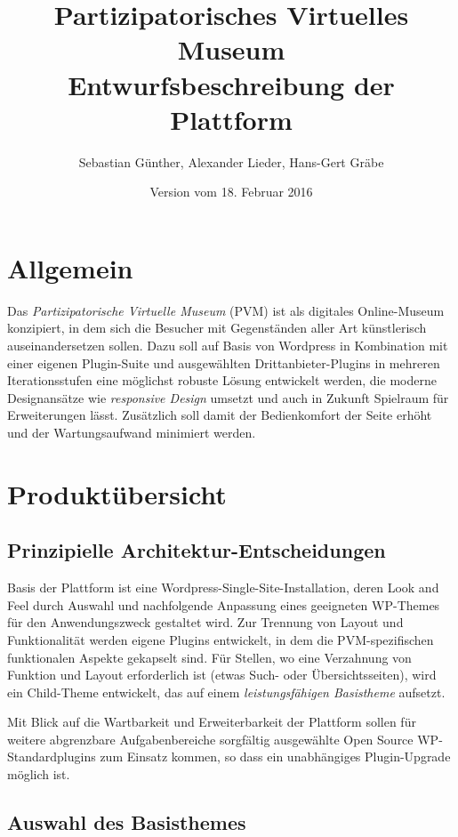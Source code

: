 \documentclass[a4paper,11pt]{article}
\title{Partizipatorisches Virtuelles Museum\\[.6em] Entwurfsbeschreibung der
  Plattform}
\date{Version vom 18. Februar 2016}
\author{Sebastian Günther, Alexander Lieder, Hans-Gert Gräbe}
\begin{document}
\maketitle
 
\section{Allgemein}
 
Das \emph{Partizipatorische Virtuelle Museum} (PVM) ist als digitales
Online-Museum konzipiert, in dem sich die Besucher mit Gegenständen aller Art
künstlerisch auseinandersetzen sollen. Dazu soll auf Basis von Wordpress in
Kombination mit einer eigenen Plugin-Suite und ausgewählten
Drittanbieter-Plugins in mehreren Iterationsstufen eine möglichst robuste
Lösung entwickelt werden, die moderne Designansätze wie \emph{responsive
  Design} umsetzt und auch in Zukunft Spielraum für Erweiterungen lässt.
Zusätzlich soll damit der Bedienkomfort der Seite erhöht und der
Wartungsaufwand minimiert werden.

\section{Produktübersicht}

\subsection{Prinzipielle Architektur-Entscheidungen}
 
Basis der Plattform ist eine Wordpress-Single-Site-Installation, deren Look
and Feel durch Auswahl und nachfolgende Anpassung eines geeigneten WP-Themes
für den Anwendungszweck gestaltet wird.  Zur Trennung von Layout und
Funktionalität werden eigene Plugins entwickelt, in dem die PVM-spezifischen
funktionalen Aspekte gekapselt sind. Für Stellen, wo eine Verzahnung von
Funktion und Layout erforderlich ist (etwas Such- oder Übersichtsseiten), wird
ein Child-Theme entwickelt, das auf einem \emph{leistungsfähigen Basistheme}
aufsetzt.

Mit Blick auf die Wartbarkeit und Erweiterbarkeit der Plattform sollen für
weitere abgrenzbare Aufgabenbereiche sorgfältig ausgewählte Open Source
WP-Standardplugins zum Einsatz kommen, so dass ein unabhängiges
Plugin-Upgrade möglich ist. 

\subsection{Auswahl des Basisthemes}
\end{document}
